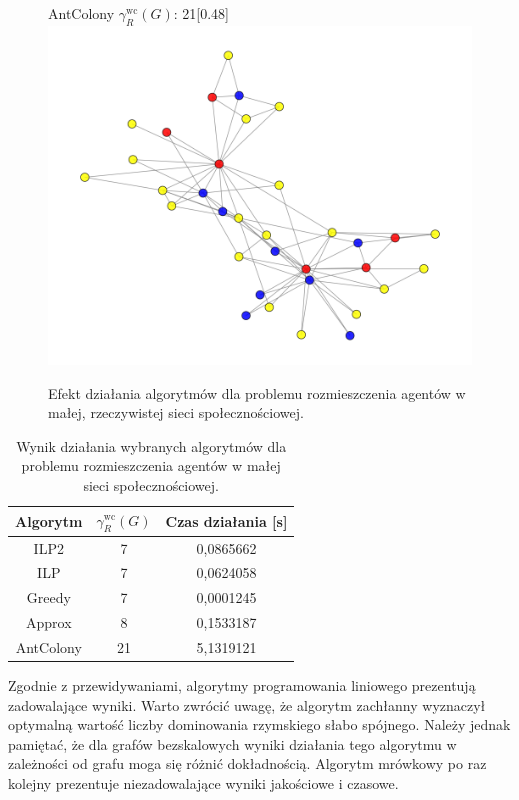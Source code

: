 \begin{figure}[H]
\begin{subcaptionbox}{AntColony  $\gamma^{\text{wc}}_R(G)$: 21\label{fig:ant}}[0.48\linewidth]
        {\includegraphics[width=\linewidth]{assets/Facebook/ant.png}}
    \end{subcaptionbox}

    \caption{Efekt działania algorytmów dla problemu rozmieszczenia agentów w małej, rzeczywistej sieci społecznościowej.}
    \label{fig:karate}
\end{figure}

\begin{table}[H]
    \centering
    \begin{tabular}{|c|c|c|}
        \hline
    Algorytm & $\gamma^{\text{wc}}_R(G)$ & Czas działania [s] \\     \hline
    ILP2 & 7 & 0,0865662 \\ \hline
    ILP & 7 & 0,0624058 \\ \hline
    Greedy & 7 & 0,0001245 \\ \hline
    Approx & 8 & 0,1533187 \\ \hline 
    AntColony & 21 & 5,1319121 \\ \hline
\end{tabular}
\caption{Wynik działania wybranych algorytmów dla problemu rozmieszczenia agentów w małej sieci społecznościowej.}
\end{table}

Zgodnie z przewidywaniami, algorytmy programowania liniowego prezentują zadowalające wyniki. Warto zwrócić uwagę, że algorytm zachłanny wyznaczył optymalną wartość liczby dominowania rzymskiego słabo spójnego. Należy jednak pamiętać, że dla grafów bezskalowych wyniki działania tego algorytmu w zależności od grafu moga się różnić dokładnością. Algorytm mrówkowy po raz kolejny prezentuje niezadowalające wyniki jakościowe i czasowe.\\


